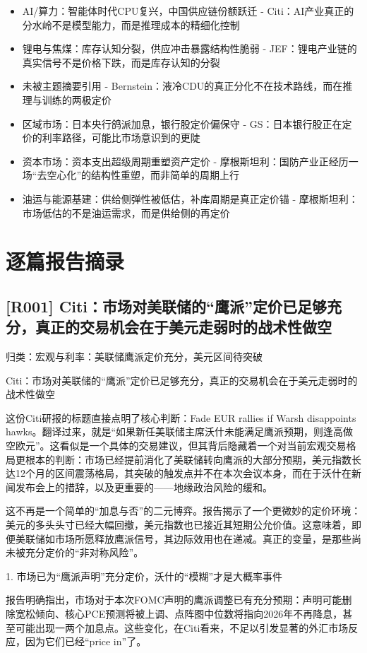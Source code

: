 \documentclass[11pt]{ctexart}
\begin{document}
\begin{itemize}
  \item [R032] AI/算力：智能体时代CPU复兴，中国供应链份额跃迁 - Citi：AI产业真正的分水岭不是模型能力，而是推理成本的精细化控制
  \item [R033] 锂电与焦煤：库存认知分裂，供应冲击暴露结构性脆弱 - JEF：锂电产业链的真实信号不是价格下跌，而是库存认知的分裂
  \item [R034] 未被主题摘要引用 - Bernstein：液冷CDU的真正分化不在技术路线，而在推理与训练的两极定价
  \item [R035] 区域市场：日本央行鸽派加息，银行股定价偏保守 - GS：日本银行股正在定价的利率路径，可能比市场意识到的更陡
  \item [R036] 资本市场：资本支出超级周期重塑资产定价 - 摩根斯坦利：国防产业正经历一场“去空心化”的结构性重塑，而非简单的周期上行
  \item [R037] 油运与能源基建：供给侧弹性被低估，补库周期是真正定价锚 - 摩根斯坦利：市场低估的不是油运需求，而是供给侧的再定价
\end{itemize}
\section{逐篇报告摘录}
\subsection{[R001] Citi：市场对美联储的“鹰派”定价已足够充分，真正的交易机会在于美元走弱时的战术性做空}
{\small\color{refgray}归类：宏观与利率：美联储鹰派定价充分，美元区间待突破}

Citi：市场对美联储的“鹰派”定价已足够充分，真正的交易机会在于美元走弱时的战术性做空

这份Citi研报的标题直接点明了核心判断：Fade EUR rallies if Warsh disappoints hawks。翻译过来，就是“如果新任美联储主席沃什未能满足鹰派预期，则逢高做空欧元”。这看似是一个具体的交易建议，但其背后隐藏着一个对当前宏观交易格局更根本的判断：市场已经提前消化了美联储转向鹰派的大部分预期，美元指数长达12个月的区间震荡格局，其突破的触发点并不在本次会议本身，而在于沃什在新闻发布会上的措辞，以及更重要的——地缘政治风险的缓和。

这不再是一个简单的“加息与否”的二元博弈。报告揭示了一个更微妙的定价环境：美元的多头头寸已经大幅回撤，美元指数也已接近其短期公允价值。这意味着，即便美联储如市场所愿释放鹰派信号，其边际效用也在递减。真正的变量，是那些尚未被充分定价的“非对称风险”。

1. 市场已为“鹰派声明”充分定价，沃什的“模糊”才是大概率事件

报告明确指出，市场对于本次FOMC声明的鹰派调整已有充分预期：声明可能删除宽松倾向、核心PCE预测将被上调、点阵图中位数将指向2026年不再降息，甚至可能出现一两个加息点。这些变化，在Citi看来，不足以引发显著的外汇市场反应，因为它们已经“price in”了。
\end{document}
